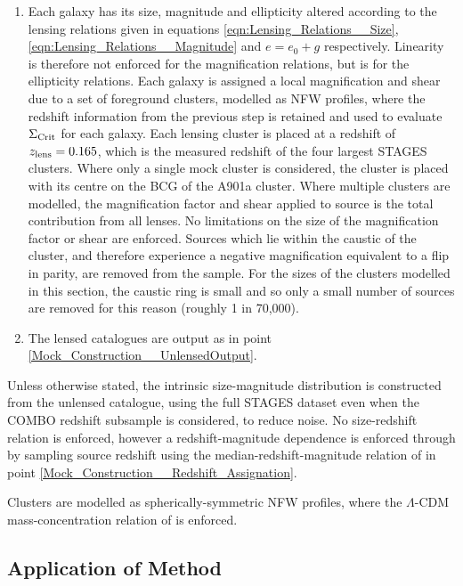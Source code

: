 \documentclass[useAMS,usenatbib,times,letter,amssymb]{mn2e}
\begin{document}
\begin{enumerate}
\item{Each galaxy has its size, magnitude and ellipticity altered according to the lensing relations given in equations \ref{eqn:Lensing_Relations__Size}, \ref{eqn:Lensing_Relations__Magnitude} and $e =e_0 + g$ respectively. Linearity is therefore not enforced for the magnification relations, but is for the ellipticity relations. Each galaxy is assigned a local magnification and shear due to a set of foreground clusters, modelled as NFW profiles, where the redshift information from the previous step is retained and used to evaluate $\Sigma_{\rm Crit}$ for each galaxy. Each lensing cluster is placed at a redshift of $z_{\rm lens} = 0.165$, which is the measured redshift of the four largest STAGES clusters. Where only a single mock cluster is considered, the cluster is placed with its centre on the BCG of the A901a cluster. Where multiple clusters are modelled, the magnification factor and shear applied to source is the total contribution from all lenses. No limitations on the size of the magnification factor or shear are enforced. Sources which lie within the caustic of the cluster, and therefore experience a negative magnification equivalent to a flip in parity, are removed from the sample. For the sizes of the clusters modelled in this section, the caustic ring is small and so only a small number of sources are removed for this reason (roughly 1 in 70,000).}\label{Mock_Construction__Lensing}
\item{The lensed catalogues are output as in point \ref{Mock_Construction__UnlensedOutput}.}
\end{enumerate}

Unless otherwise stated, the intrinsic size-magnitude distribution is constructed from the unlensed catalogue, using the full STAGES dataset even when the COMBO redshift subsample is considered, to reduce noise. No size-redshift relation is enforced, however a redshift-magnitude dependence is enforced through by sampling source redshift using the median-redshift-magnitude relation of \cite{Schrabback:2007p2802} in point \ref{Mock_Construction__Redshift_Assignation}.

Clusters are modelled as spherically-symmetric NFW profiles, where the $\Lambda$-CDM mass-concentration relation of \cite{Dolag:2004p2721} is enforced.

\subsection{Application of Method}
\end{document}
